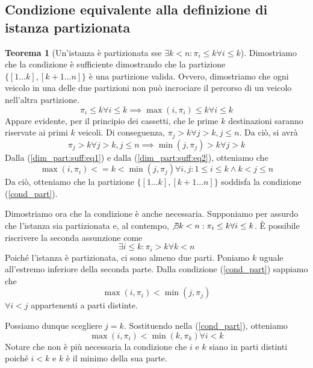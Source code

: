 \documentclass{article}
\theoremstyle{definition}
\newtheorem{theorem}{Teorema}
\begin{document}
\subsection{Condizione equivalente alla definizione di istanza partizionata}
\begin{theorem}[Un'istanza è partizionata sse $\exists k < n : \pi_i \leq k \forall i \leq k$]
    \label{dim_part_iniziale}
    Dimostriamo che la condizione è sufficiente dimostrando che la partizione $\{[1\dots k],[k+1\dots n]\}$ è una partizione valida.
    Ovvero, dimostriamo che ogni veicolo in una delle due partizioni non può incrociare il percorso di un veicolo nell'altra partizione.
    \begin{equation}
        \label{dim_part:suff:eq1}
        \pi_i \leq k \forall i \leq k \implies \max(i, \pi_i) \leq k \forall i \leq k
    \end{equation}
    Appare evidente, per il principio dei cassetti, che le prime $k$ destinazioni saranno riservate ai primi $k$ veicoli.
    Di conseguenza,
    $\pi_j > k \forall j > k, j \leq n$.
    Da ciò, si avrà
    \begin{equation}
        \label{dim_part:suff:eq2}
        \pi_j > k \forall j > k, j \leq n \implies \min(j, \pi_j) > k \forall j > k
    \end{equation}
    Dalla (\ref{dim_part:suff:eq1}) e dalla (\ref{dim_part:suff:eq2}), otteniamo che
    \[ \max(i, \pi_i) <= k < \min(j, \pi_j) \forall i,j : 1 \leq i \leq k \wedge k < j \leq n \]
    Da ciò, otteniamo che la partizione $\{[1\dots k], [k+1\dots n]\}$ soddisfa la condizione (\ref{cond_part}).

    Dimostriamo ora che la condizione è anche necessaria.
    Supponiamo per assurdo che l'istanza sia partizionata e, al contempo,
    $\not\exists k < n : \pi_i \leq k \forall i \leq k$.
    È possibile riscrivere la seconda assunzione come
    \begin{equation}
        \label{dim_part:nec:abs_hy}
        \exists i \leq k : \pi_i > k \forall k < n
    \end{equation}
    Poiché l'istanza è partizionata, ci sono almeno due parti.
    Poniamo $k$ uguale all'estremo inferiore della seconda parte.
    Dalla condizione (\ref{cond_part}) sappiamo che
    \[ \max(i, \pi_i) < \min(j, \pi_j) \]
    $\forall i < j$ appartenenti a parti distinte.

    Possiamo dunque scegliere $j = k$.
    Sostituendo nella (\ref{cond_part}), otteniamo
    \begin{equation}
        \label{dim_part:nec:eq1}
        \max(i, \pi_i) < \min(k, \pi_k) \forall i < k
    \end{equation}
    Notare che non è più necessaria la condizione che $i$ e $k$ siano in parti distinti poiché $i < k$ e $k$ è il minimo della sua parte.


\end{theorem}
\end{document}
